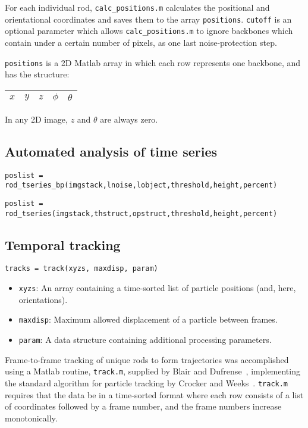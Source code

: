For each individual rod, \texttt{calc\_positions.m} calculates the positional and
orientational coordinates and saves them to the array \texttt{positions}.  
\texttt{cutoff} is an optional parameter which allows \texttt{calc\_positions.m} to 
ignore backbones which contain under a certain number of pixels, as one last noise-protection step.

\texttt{positions} is a 2D Matlab array in which each row represents one backbone, and has 
the structure:

\begin{tabular}{ | c | c | c | c | c | }
\hline 
$x$ & $y$ & $z$ & $\phi$ & $\theta$ \\
\hline
\end{tabular}

In any 2D image, $z$ and $\theta$ are always zero.

\subsection{Automated analysis of time series}

\texttt{poslist = rod\_tseries\_bp(imgstack,lnoise,lobject,threshold,height,percent)}

\texttt{poslist = rod\_tseries(imgstack,thstruct,opstruct,threshold,height,percent)}

\subsection{Temporal tracking}

\texttt{tracks = track(xyzs, maxdisp, param)}

\begin{itemize}
\item \texttt{xyzs}: An array containing a time-sorted list of particle positions (and, here, orientations).
\item \texttt{maxdisp}: Maximum allowed displacement of a particle between frames.
\item \texttt{param}: A data structure containing additional processing parameters.
\end{itemize}

Frame-to-frame tracking of unique rods to form trajectories was accomplished using a Matlab routine, \texttt{track.m}, 
supplied by Blair and Dufrense~\cite{blair-matlab}, implementing the standard algorithm for particle tracking by
Crocker and Weeks~\cite{crocker-tracking}.  \texttt{track.m} requires that the data be in a time-sorted format where each
row consists of a list of coordinates followed by a frame number, and the frame numbers increase monotonically.

